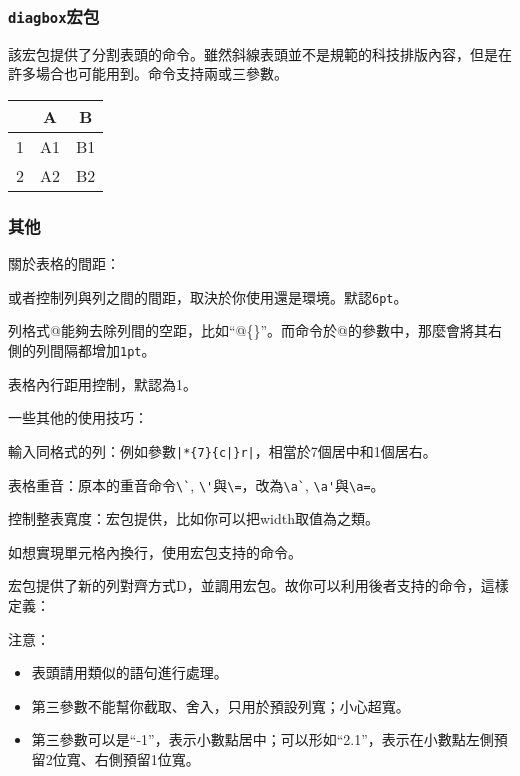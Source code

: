 \subsubsection{\texttt{diagbox}宏包}
該宏包提供了分割表頭的命令。雖然斜線表頭並不是規範的科技排版內容，但是在許多場合也可能用到。命令支持兩或三參數。
\begin{codeshow}
\begin{tabular}{c|cc}
\diagbox{左邊}{中間}{右邊} & A & B \\
\hline
1 & A1 & B1 \\
2 & A2 & B2 
\end{tabular}
\end{codeshow}

\subsubsection{其他}
關於表格的間距：
\begin{feai}
\item {}或者控制列與列之間的間距，取決於你使用還是環境。默認\texttt{6pt}。
\item 列格式@能夠去除列間的空距，比如“@\{\}”。而命令於@的參數中，那麼會將其右側的列間隔都增加\texttt{1pt}。
\item 表格內行距用控制，默認為1。
\end{feai}

一些其他的使用技巧：
\begin{feae}
\item 輸入同格式的列：例如參數\verb+|*{7}{c|}r|+，相當於7個居中和1個居右。
\item 表格重音：原本的重音命令\verb|\`|, \verb|\'|與\verb|\=|，改為\verb|\a`|, \verb|\a'|與\verb|\a=|。
\item 控制整表寬度：宏包提供，比如你可以把width取值為之類。
\item 如想實現單元格內換行，使用宏包支持的命令。
\item 宏包提供了新的列對齊方式D，並調用宏包。故你可以利用後者支持的命令，這樣定義：
注意：\begin{itemize}
\item 表頭請用類似的語句進行處理。
\item 第三參數不能幫你截取、舍入，只用於預設列寬；小心超寬。
\item 第三參數可以是“-1”，表示小數點居中；可以形如“2.1”，表示在小數點左側預留2位寬、右側預留1位寬。
\end{itemize}
\end{feae}

